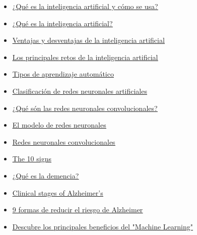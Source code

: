 \documentclass[a4paper,12pt]{report}
\begin{document}
\begin{itemize}
    \item \href{https://www.europarl.europa.eu/news/es/headlines/society/20200827STO85804/que-es-la-inteligencia-artificial-y-como-se-usa}{\underline{¿Qué es la inteligencia artificial y cómo se usa?}}
    \item \href{https://www.iberdrola.com/innovacion/que-es-inteligencia-artificial}{\underline{¿Qué es la inteligencia artificial?}}
    \item \href{https://nexusintegra.io/es/ventajas-y-desventajas-de-la-inteligencia-artificial/}{\underline{Ventajas y desventajas de la inteligencia artificial}}
    \item \href{https://www.santander.com/es/sala-de-comunicacion/dp/los-principales-retos-de-la-inteligencia-artificial}{\underline{Los principales retos de la inteligencia artificial}}
    \item \href{https://keepcoding.io/blog/tipos-de-aprendizaje-automatico/}{\underline{Tipos de aprendizaje automático}}
    \item \href{https://www.diegocalvo.es/clasificacion-de-redes-neuronales-artificiales/}{\underline{Clasificación de redes neuronales artificiales}}
    \item \href{https://keepcoding.io/blog/redes-neuronales-convolucionales/#Que_son_las_Redes_Neuronales_Convolucionales}{\underline{¿Qué són las redes neuronales convolucionales?}}
    \item \href{https://www.ibm.com/docs/es/spss-modeler/saas?topic=networks-neural-model}{\underline{El modelo de redes neuronales}}
    \item \href{https://www.juanbarrios.com/redes-neurales-convolucionales/ }{\underline{Redes neuronales convolucionales}}
    \item \href{https://www.alz.org/alzheimers-dementia/10_signs}{\underline{The 10 signs}}
    \item \href{https://www.cdc.gov/aging/spanish/features/dementia.html}{\underline{¿Qué es la demencia?}}
    \item \href{https://www.alzinfo.org/understand-alzheimers/clinical-stages-of-alzheimers/}{\underline{Clinical stages of Alzheimer's}}
    \item \href{https://www.ceafa.es/es/que-comunicamos/noticias/9-formas-de-reducir-el-riesgo-de-alzheimer}{\underline{9 formas de reducir el riesgo de Alzheimer}}
    \item \href{https://www.iberdrola.com/innovacion/machine-learning-aprendizaje-automatico}{\underline{Descubre los principales beneficios del "Machine Learning"}}

\end{itemize}
\end{document}
